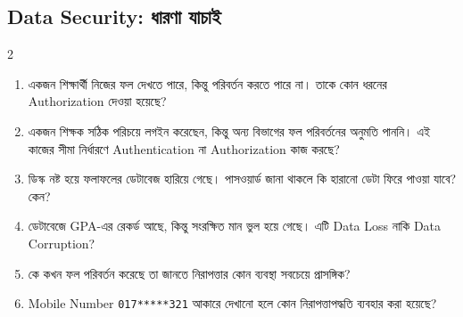 \subsection{Data Security: ধারণা যাচাই}
\begin{multicols}{2}
\small
\begin{enumerate}
\item \begin{minipage}[t]{\linewidth}
একজন শিক্ষার্থী নিজের ফল দেখতে পারে, কিন্তু পরিবর্তন
          করতে পারে না। তাকে কোন ধরনের Authorization দেওয়া হয়েছে?
\end{minipage}
\item \begin{minipage}[t]{\linewidth}
একজন শিক্ষক সঠিক পরিচয়ে লগইন করেছেন, কিন্তু অন্য বিভাগের ফল
          পরিবর্তনের অনুমতি পাননি। এই কাজের সীমা নির্ধারণে Authentication না
          Authorization কাজ করছে?
\end{minipage}
\item \begin{minipage}[t]{\linewidth}
ডিস্ক নষ্ট হয়ে ফলাফলের ডেটাবেজ হারিয়ে গেছে।
          পাসওয়ার্ড জানা থাকলে কি হারানো ডেটা ফিরে পাওয়া যাবে? কেন?
\end{minipage}
\item \begin{minipage}[t]{\linewidth}
ডেটাবেজে GPA-এর রেকর্ড আছে, কিন্তু সংরক্ষিত মান ভুল হয়ে গেছে।
          এটি Data Loss নাকি Data Corruption?
\end{minipage}
\item \begin{minipage}[t]{\linewidth}
কে কখন ফল পরিবর্তন করেছে তা জানতে নিরাপত্তার কোন ব্যবস্থা
          সবচেয়ে প্রাসঙ্গিক?
\end{minipage}
\item \begin{minipage}[t]{\linewidth}
Mobile Number
          \texttt{017*****321}
          আকারে দেখানো হলে কোন নিরাপত্তাপদ্ধতি ব্যবহার করা হয়েছে?
\end{minipage}
\end{enumerate}
\end{multicols}



